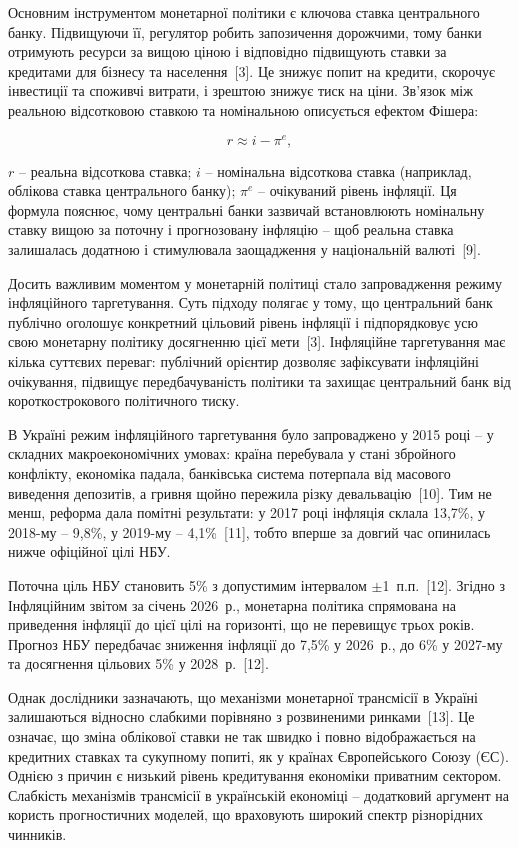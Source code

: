 \documentclass{bachelor_thesis}
\begin{document}
Основним інструментом монетарної політики є ключова ставка центрального банку. Підвищуючи її, регулятор робить запозичення дорожчими, тому банки отримують ресурси за вищою ціною і відповідно підвищують ставки за кредитами для бізнесу та населення~[3]. Це знижує попит на кредити, скорочує інвестиції та споживчі витрати, і зрештою знижує тиск на ціни. Зв'язок між реальною відсотковою ставкою та номінальною описується ефектом Фішера:

\begin{equation*}
r \approx i - \pi^e,
\end{equation*}

 $r$ -- реальна відсоткова ставка; $i$ -- номінальна відсоткова ставка (наприклад, облікова ставка центрального банку); $\pi^e$ -- очікуваний рівень інфляції. Ця формула пояснює, чому центральні банки зазвичай встановлюють номінальну ставку вищою за поточну і прогнозовану інфляцію -- щоб реальна ставка залишалась додатною і стимулювала заощадження у національній валюті~[9].

Досить важливим моментом у монетарній політиці стало запровадження режиму інфляційного таргетування. Суть підходу полягає у тому, що центральний банк публічно оголошує конкретний цільовий рівень інфляції і підпорядковує усю свою монетарну політику досягненню цієї мети~[3]. Інфляційне таргетування має кілька суттєвих переваг: публічний орієнтир дозволяє зафіксувати інфляційні очікування, підвищує передбачуваність політики та захищає центральний банк від короткострокового політичного тиску.

В Україні режим інфляційного таргетування було запроваджено у 2015 році -- у складних макроекономічних умовах: країна перебувала у стані збройного конфлікту, економіка падала, банківська система потерпала від масового виведення депозитів, а гривня щойно пережила різку девальвацію~[10]. Тим не менш, реформа дала помітні результати: у 2017 році інфляція склала 13,7\%, у 2018-му -- 9,8\%, у 2019-му -- 4,1\%~[11], тобто вперше за довгий час опинилась нижче офіційної цілі НБУ.

Поточна ціль НБУ становить 5\% з допустимим інтервалом $\pm$1~п.п.~[12]. Згідно з Інфляційним звітом за січень 2026~р., монетарна політика спрямована на приведення інфляції до цієї цілі на горизонті, що не перевищує трьох років. Прогноз НБУ передбачає зниження інфляції до 7,5\% у 2026~р., до 6\% у 2027-му та досягнення цільових 5\% у 2028~р.~[12].

Однак дослідники зазначають, що механізми монетарної трансмісії в Україні залишаються відносно слабкими порівняно з розвиненими ринками~[13]. Це означає, що зміна облікової ставки не так швидко і повно відображається на кредитних ставках та сукупному попиті, як у країнах Європейського Союзу (ЄС). Однією з причин є низький рівень кредитування економіки приватним сектором. Слабкість механізмів трансмісії в українській економіці -- додатковий аргумент на користь прогностичних моделей, що враховують широкий спектр різнорідних чинників.
\end{document}
